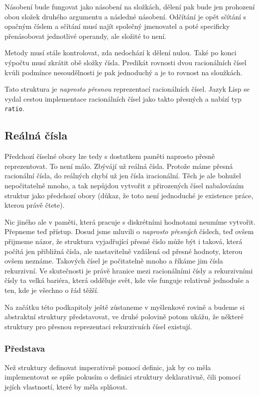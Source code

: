 Násobení bude fungovat jako násobení na složkách, dělení pak bude jen prohození obou složek druhého argumentu a následné násobení. Odčítání je opět sčítání s opačným číslem a sčítání musí najít společný jmenovatel a poté specificky přenásobovat jednotlivé operandy, ale složité to není.

Metody musí stále kontrolovat, zda nedochází k dělení nulou. Také po konci výpočtu musí zkrátit obě složky čísla. Predikát rovnosti dvou racionálních čísel kvůli podmínce nesoudělnosti je pak jednoduchý a je to rovnost na sloužkách.

Tato struktura je \textit{naprosto přesnou} reprezentací racionálních čísel. Jazyk Lisp se vydal cestou implementace racionálních čísel jako takto přesných a nabízí typ \texttt{ratio}.

\subsection{Reálná čísla}
Předchozí číselné obory lze tedy s dostatkem paměti naprosto přesně reprezentovat. To není málo. Zbývájí už  reálná čísla. Protože máme přesná racionální čísla, do reálných chybí už jen čísla iracionální. Těch je ale bohužel nepočitatelně mnoho, a tak nepůjdou vytvořit z přirozených čísel nabalováním struktur jako předchozí obory (důkaz, že toto není jednoduché je existence práce, kterou právě čtete).

Nic jiného ale v paměti, která pracuje s diskrétními hodnotami neumíme vytvořit. Přepneme teď přístup. Dosud jsme mluvili o \textit{naprosto přesných} číslech, teď ovšem přijmeme názor, že struktura vyjadřující přesné číslo může být i taková, která počítá jen přibližná čísla, ale nastavitelně vzdálená od přesné hodnoty, kterou ovšem neznáme. Takových čísel je počitatelně mnoho a říkáme jim čísla rekurzivní. Ve skutečnosti je právě hranice mezi racionálními čísly a rekurzivními čísly ta velká bariéra, která odděluje svět, kde vše funguje relativně jednoduše a ten, kde je všechno o řád těžší.

Na začátku této podkapitoly ještě zůstaneme v myšlenkové rovině a budeme si abstraktní struktury představovat, ve druhé polovině potom ukážu, že některé struktury pro přesnou reprezentaci rekurzivních čísel existují.

\subsubsection{Představa}\label{kap:predstava}
Než struktury definovat imperativně pomocí definic, jak by co měla implementovat se spíše pokusím o definici struktury deklarativně, čili pomocí jejích vlastností, které by měla splňovat.

